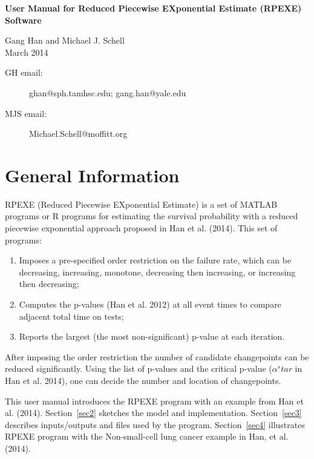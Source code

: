 \documentclass[12pt] {article}
\begin{document}
\begin{center}
{\bf User Manual for {\Large R}educed {\Large P}iecewise
{\Large EX}ponential {\Large E}stimate (RPEXE) Software}
\end{center}
\vspace{.2in}
\begin{center}
\large{Gang Han and Michael J. Schell} \\
\large{March 2014}
\end{center}
\vspace{3mm}
\begin{small}
\begin{description}
\item [GH email:] ghan@sph.tamhsc.edu; gang.han@yale.edu
\item [MJS email:] Michael.Schell@moffitt.org
\end{description}
\end{small}

\section{General Information}
RPEXE (Reduced Piecewise EXponential Estimate) is a set of MATLAB programs
or R programs for estimating the survival probability with a reduced
piecewise exponential approach proposed in Han et al. (2014). This set
of programs:
\begin{enumerate}
\item Imposes a pre-specified order restriction on the failure rate, which can be decreasing, increasing, monotone, decreasing then increasing, or increasing
    then decreasing;
\item Computes the p-values (Han et al. 2012) at all event times to compare adjacent total time on tests;
\item Reports the largest (the most non-significant) p-value at each iteration.
\end{enumerate}
After imposing the order restriction the number of candidate changepoints can be
reduced significantly. Using the list of p-values and the critical p-value
 ($\alpha^star$ in Han et al. 2014), one can decide the number and location of changepoints.

This user manual introduces the RPEXE program with an example from Han et al. (2014).
Section~\ref{sec2} sketches the model and implementation. Section~\ref{sec3}
describes inputs/outputs and files used by the program.
Section~\ref{sec4} illustrates RPEXE program with the Non-small-cell lung cancer example in Han, et al. (2014).
\end{document}
